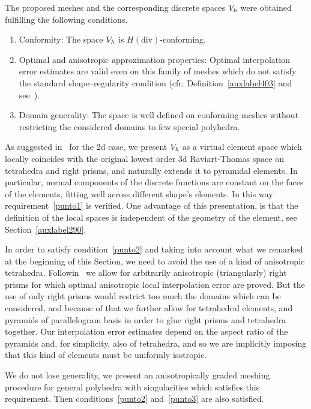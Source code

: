 The proposed meshes and the corresponding discrete spaces $V_{\textit h}$ 
were obtained fulfilling
the following conditions.
\begin{enumerate}
\item \label{punto1} Conformity: 
The space $V_{\textit h}$ is $H(\mbox{div})$-conforming.
\item \label{punto2} Optimal and anisotropic approximation properties: 
Optimal interpolation error estimates are valid even on this family of 
meshes which do not satisfy the standard shape--regularity condition 
(cfr. Definition~\ref{auxlabel403} and see~\cite{ciarlet}).
\item \label{punto3} Domain generality: The space is well defined on 
conforming meshes without restricting the 
considered domains to few special polyhedra. 
\end{enumerate}
As suggested in~\cite{bfm} for the 2d case, we present $V_{\textit h}$ as a 
virtual element space which 
locally coincides with the original lowest order 3d Raviart-Thomas space on
tetrahedra and right prisms, and naturally extends it to pyramidal elements. 
In particular, normal components of the discrete functions are constant on the 
faces of the 
elements, fitting well across different shape's elements. 
In this way requirement~\ref{punto1} is verified. 
One advantage of this presentation, is that the definition of the local spaces 
is independent of the 
geometry of the element, see Section~\ref{auxlabel290}. 

In order to satisfy condition~\ref{punto2} and taking into account what we 
remarked at the beginning of this Section, we need to avoid the use of a 
kind of anisotropic 
tetrahedra. Followin~\cite{MR1866274} we allow for arbitrarily anisotropic 
(triangularly) 
right prisms for which optimal anisotropic local interpolation error are proved. But the 
use of only right prisms would restrict too much the domains which can be considered, 
and because of that we further allow for tetrahedral elements, and pyramids of parallelogram basis
in order to glue right prisms and tetrahedra together. 
Our interpolation error estimates depend on the aspect ratio of the pyramids 
and, for simplicity, also of tetrahedra, and so we are implicitly imposing 
that this kind of elements must be uniformly isotropic. 

We do not 
lose generality, we present an anisotropically graded meshing procedure
for general polyhedra with singularities which satisfies this requirement.
Then conditions~\ref{punto2} and~\ref{punto3} are also satisfied.  



